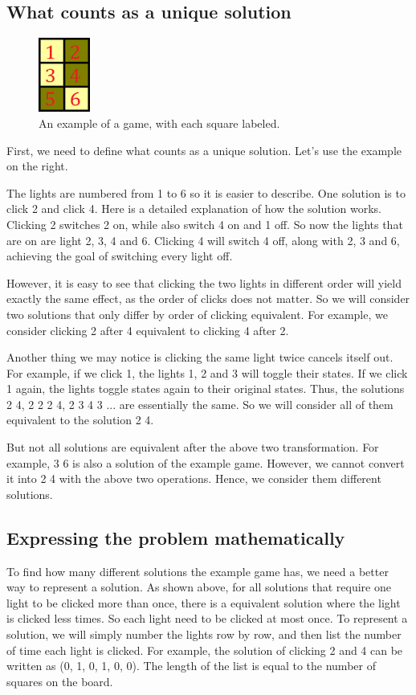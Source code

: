 \documentclass[a4paper, 12pt]{article}
\begin{document}
\subsection{What counts as a unique solution}
\begin{figure}
    \centering
    \includegraphics[width=0.15\textwidth]{img1.png}
    \caption{An example of a game, with each square labeled.}
\end{figure}

First, we need to define what counts as a unique solution. Let’s use the example on the right.

The lights are numbered from 1 to 6 so it is easier to describe. One solution is to click 2 and click 4. Here is a detailed explanation of how the solution works. Clicking 2 switches 2 on, while also switch 4 on and 1 off. So now the lights that are on are light 2, 3, 4 and 6. Clicking 4 will switch 4 off, along with 2, 3 and 6, achieving the goal of switching every light off.

However, it is easy to see that clicking the two lights in different order will yield exactly the same effect, as the order of clicks does not matter. So we will consider two solutions that only differ by order of clicking equivalent. For example, we consider clicking 2 after 4 equivalent to clicking 4 after 2.

Another thing we may notice is clicking the same light twice cancels itself out. For example, if we click 1, the lights 1, 2 and 3 will toggle their states. If we click 1 again, the lights toggle states again to their original states. Thus, the solutions 2 4, 2 2 2 4, 2 3 4 3 ... are essentially the same. So we will consider all of them equivalent to the solution 2 4.

But not all solutions are equivalent after the above two transformation. For example, 3 6 is also a solution of the example game. However, we cannot convert it into 2 4 with the above two operations. Hence, we consider them different solutions.

\subsection{ Expressing the problem mathematically }
To find how many different solutions the example game has, we need a better way to represent a solution. As shown above, for all solutions that require one light to be clicked more than once, there is a equivalent solution where the light is clicked less times. So each light need to be clicked at most once. To represent a solution, we will simply number the lights row by row, and then list the number of time each light is clicked. For example, the solution of clicking 2 and 4 can be written as (0, 1, 0, 1, 0, 0). The length of the list is equal to the number of squares on the board.
\end{document}
